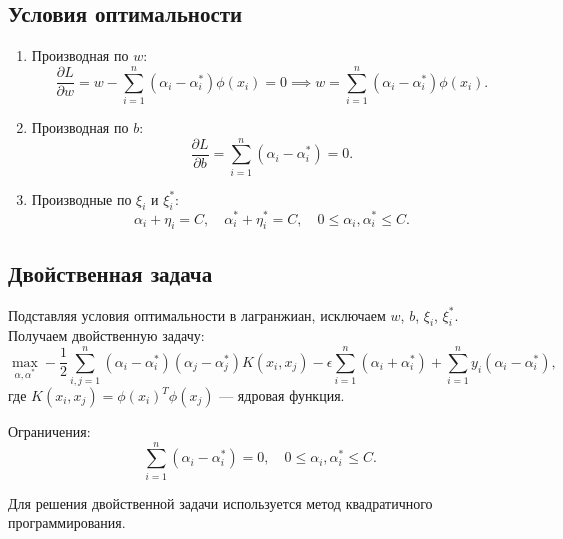 \subsection{Условия оптимальности}
\begin{enumerate}
    \item Производная по \(w\):
    \begin{equation*}
        \frac{\partial L}{\partial w} = w - \sum_{i=1}^n (\alpha_i - \alpha_i^*) \phi(x_i) = 0 \implies 
        w = \sum_{i=1}^n (\alpha_i - \alpha_i^*) \phi(x_i).
    \end{equation*}
    \item Производная по \(b\):
    \begin{equation*}
        \frac{\partial L}{\partial b} = \sum_{i=1}^n (\alpha_i - \alpha_i^*) = 0.
    \end{equation*}
    \item Производные по \(\xi_i\) и \(\xi_i^*\):
    \begin{equation*}
        \alpha_i + \eta_i = C, \quad \alpha_i^* + \eta_i^* = C, \quad 0 \leq \alpha_i, \alpha_i^* \leq C.
    \end{equation*}
\end{enumerate}

\subsection{Двойственная задача}
\par Подставляя условия оптимальности в лагранжиан, исключаем \(w\), \(b\), \(\xi_i\), \(\xi_i^*\). Получаем двойственную задачу:
\begin{equation*}
    \max_{\alpha, \alpha^*} -\frac{1}{2} \sum_{i,j=1}^n (\alpha_i - \alpha_i^*)(\alpha_j - \alpha_j^*) K(x_i, x_j) 
    - \epsilon \sum_{i=1}^n (\alpha_i + \alpha_i^*) + \sum_{i=1}^n y_i (\alpha_i - \alpha_i^*),
\end{equation*}
где \(K(x_i, x_j) = \phi(x_i)^T \phi(x_j)\) — ядровая функция.
\par Ограничения:
\begin{equation*}
    \sum_{i=1}^n (\alpha_i - \alpha_i^*) = 0, \quad 0 \leq \alpha_i, \alpha_i^* \leq C.
\end{equation*}
\par Для решения двойственной задачи используется метод квадратичного программирования.

